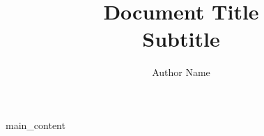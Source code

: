 \documentclass[11pt]{article}
\title{
    \textbf{\Huge Document Title}
    \\
    Subtitle
}
\author{Author Name}
\date{}
\begin{document}
\maketitle
\newpage
\tableofcontents
{{ main_content }}
\end{document}
